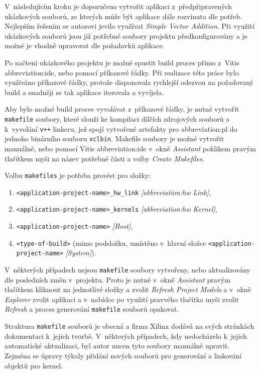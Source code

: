 \documentclass[a4paper, twoside, 11pt]{article}
\begin{document}
		V~následujícím kroku je doporučeno vytvořit aplikaci z~předpřipravených ukázkových souborů, ze kterých může být aplikace dále rozvinuta dle potřeb. Nejlepším řešením se autorovi jevilo využívat \textit{Simple Vector Addition}. Při využití ukázkových souborů jsou již potřebné soubory projektu předkonfigurovány a je možné je vhodně upravovat dle požadavků aplikace.\par
		Po načtení ukázkového projektu je možné spustit build proces přímo z~Vitis \gls{abbreviation:ide}, nebo pomocí příkazové řádky. Při realizace této práce bylo využíváno příkazové řádky, protože disponovala rychlejší odezvou na požadovaný build a snadněji se tak aplikace iterovala a vyvíjela.\par
		Aby bylo možné build proces vyvolávat z~příkazové řádky, je nutné vytvořit \texttt{makefile} soubory, které slouží ke kompilaci dílčích zdrojových souborů a k~vyvolání \texttt{v++} linkeru, jež spojí vytvořené artefakty pro \gls{abbreviation:pl} do jednoho binárního souboru \texttt{xclbin}. Makefile soubory je možné vytvořit manuálně, nebo pomocí Vitis \gls{abbreviation:ide} v~okně \textit{Assistant} poklikem pravým tlačítkem myši na název potřebné části a volby \textit{Create Makefiles}.\par
		\vspace*{0.35cm}
		Volbu \texttt{makefiles} je potřeba provést pro složky:
		\begin{enumerate}
			\item \texttt{<application-project-name>\_hw\_link} \textit{[\gls{abbreviation:hw} Link]},
			\item \texttt{<application-project-name>\_kernels} \textit{[\gls{abbreviation:hw} Kernel]},
			\item \texttt{<application-project-name>} \textit{[Host]},
			\item \texttt{<type-of-build>} (mimo podsložku, umístěno v~hlavní složce \texttt{<application-project-name>} \textit{[System]}).
		\end{enumerate}
		\vspace*{0.75cm}
		V~některých případech nejsou \texttt{makefile} soubory vytvořeny, nebo aktualizovány dle posledních změn v~projektu. Proto je nutné v~okně \textit{Assistant} pravým tlačítkem kliknout na jednotlivé složky a zvolit \textit{Refresh Project Models} a v~okně \textit{Explorer} zvolit aplikaci a v~nabídce po využití pravvého tlačítka myši zvolit \textit{Refresh} a proces generování \texttt{makefile} souborů opakovat.\par
		Struktura \texttt{makefile} souborů je obecná a firma Xilinx dodává na svých stránkách dokumentaci k~jejich tvorbě. V~některých případech, kdy nedocházelo k~jejich automatické aktualizaci, byl autor nucen tyto soubory manuálně upravit. Zejména se úpravy týkaly přidání nových souborů pro generování a linkování objektů pro kernel.\par
\end{document}
